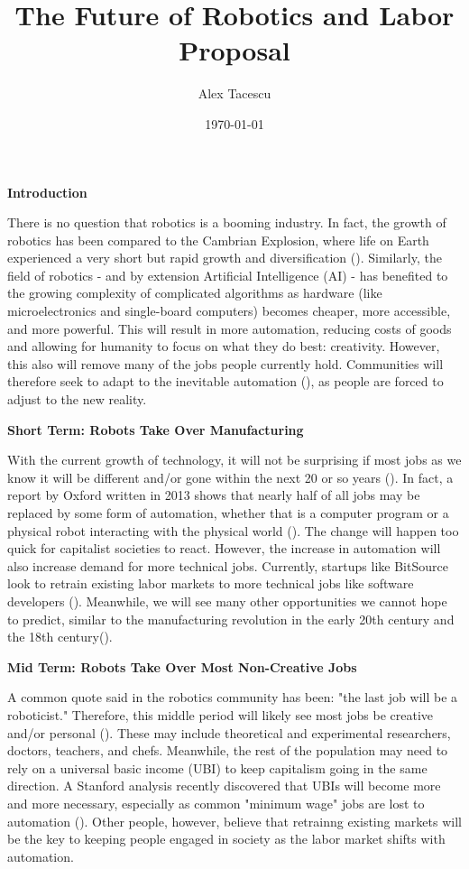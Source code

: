\documentclass[12pt,letterpaper,man,natbib]{apa6}
\title{\large{The Future of Robotics and Labor Proposal}}
\author{Alex Tacescu}
\affiliation{HUA 4900 Robotics, AI, and Ethics}
\date{\today}
\begin{document}
    \maketitle

    \textbf{Introduction}

    There is no question that robotics is a booming industry. In fact, the growth of robotics has been compared to the Cambrian Explosion, where life on Earth experienced a very short but rapid growth and diversification (\cite{Cambrian}). Similarly, the field of robotics - and by extension Artificial Intelligence (AI) - has benefited to the growing complexity of complicated algorithms as hardware (like microelectronics and single-board computers) becomes cheaper, more accessible, and more powerful. This will result in more automation, reducing costs of goods and allowing for humanity to focus on what they do best: creativity. However, this also will remove many of the jobs people currently hold. Communities will therefore seek to adapt to the inevitable automation (\cite{UnionsAutomation}), as people are forced to adjust to the new reality. 

    \textbf{Short Term: Robots Take Over Manufacturing}
    
    With the current growth of technology, it will not be surprising if most jobs as we know it will be different and/or gone within the next 20 or so years (\cite{1/2Jobs20Years}). In fact, a report by Oxford written in 2013 shows that nearly half of all jobs may be replaced by some form of automation, whether that is a computer program or a physical robot interacting with the physical world (\cite{OxfordJobsAreComputerized}). The change will happen too quick for capitalist societies to react. However, the increase in automation will also increase demand for more technical jobs. Currently, startups like BitSource look to retrain existing labor markets to more technical jobs like software developers (\cite{CoalToCode}). Meanwhile, we will see many other opportunities we cannot hope to predict, similar to the manufacturing revolution in the early 20th century and the 18th century(\cite{IndustrialRobotRevolution}).

    \textbf{Mid Term: Robots Take Over Most Non-Creative Jobs} 
    
    A common quote said in the robotics community has been: "the last job will be a roboticist." Therefore, this middle period will likely see most jobs be creative and/or personal (\cite{JobsNoAI}). These may include theoretical and experimental researchers, doctors, teachers, and chefs. Meanwhile, the rest of the population may need to rely on a universal basic income (UBI) to keep capitalism going in the same direction. A Stanford analysis recently discovered that UBIs will become more and more necessary, especially as common "minimum wage" jobs are lost to automation (\cite{StanfordUBI}). Other people, however, believe that retrainng existing markets will be the key to keeping people engaged in society as the labor market shifts with automation.
\end{document}
